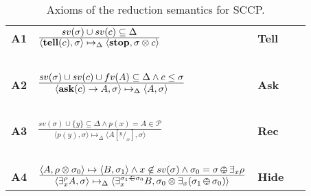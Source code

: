 \documentclass{llncs}
\newcommand{\tell}{{\bf tell}}
\newcommand{\ask}{{\bf ask}}
\newcommand{\ostop}{{\bf stop}}
\def\odiv{\, {\ominus\hspace{-7.7pt} \div} \,}
\begin{document}
\begin{table}  %
   \begin{center}
   \begin{tabular}{llll} 
   \mbox{\bf A1}& $\frac{\displaystyle sv(\sigma) \cup sv(c) \subseteq \Delta } {\displaystyle \langle \hbox{\tell}(c), \sigma \rangle \mapsto_\Delta  \langle \hbox{\ostop},
                                               \sigma \otimes c\rangle}$
   \ \ \ & \bf{Tell}&
  \\ 
  &\mbox{   }&\mbox{   } &\mbox{   }
  \\
  \mbox{\bf A2}& $\frac {\displaystyle sv(\sigma) \cup sv(c) \cup fv(A) \subseteq \Delta \wedge c \leq \sigma}{\displaystyle
  	\begin{array}{l} \langle \hbox{\ask}(c) \rightarrow A, \sigma \rangle \mapsto_\Delta \langle A, \sigma \rangle   	\end{array}}$
    \ \ \ & \bf{Ask}&
    \\
    &\mbox{   }&\mbox{   }&
    \\
  \mbox{\bf A3}& $\frac {\displaystyle sv(\sigma) \cup \{y\} \subseteq \Delta \wedge \displaystyle p(x) = A \in \mathcal{P} }
  {\displaystyle\langle p(y),\sigma\rangle \mapsto_\Delta \langle A[^y/_x], \sigma \rangle}$ 
  &\bf{Rec}&
  \\
    &\mbox{   }&\mbox{   }&
  \\
    \mbox{\bf A4}& $\frac {\displaystyle \langle A, \rho \otimes \sigma_0 \rangle
    \mapsto \langle B, \sigma_1 \rangle \wedge x \not \in sv(\sigma) \wedge \sigma_0 
    = \sigma \odiv \exists_x \rho }
    {\displaystyle\langle \exists^{\rho}_x A,\sigma\rangle \mapsto_\Delta \langle 
    \exists^{\sigma_1 \odiv \sigma_0}_x B, \sigma_0 \otimes \exists_x(\sigma_1 \odiv \sigma_0) 
    \rangle}$
    &\bf{Hide}&
  \end{tabular}
  \end{center}
\caption{Axioms of the reduction semantics for SCCP.}
\label{fig:operational}
\end{table}
\end{document}
